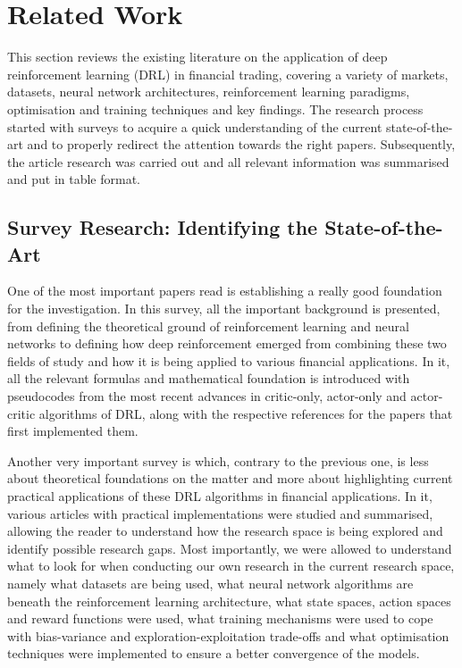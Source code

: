 \section{Related Work}

This section reviews the existing literature on the application of deep reinforcement learning (DRL) in financial trading, covering a variety of markets, datasets, neural network architectures, reinforcement learning paradigms, optimisation and training techniques and key findings. The research process started with surveys to acquire a quick understanding of the current state-of-the-art and to properly redirect the attention towards the right papers. Subsequently, the article research was carried out and all relevant information was summarised and put in table format.

\subsection{Survey Research: Identifying the State-of-the-Art}

One of the most important papers read is \cite{hambly_recent_2023} establishing a really good foundation for the investigation. In this survey, all the important background is presented, from defining the theoretical ground of reinforcement learning and neural networks to defining how deep reinforcement emerged from combining these two fields of study and how it is being applied to various financial applications. In it, all the relevant formulas and mathematical foundation is introduced with pseudocodes from the most recent advances in critic-only, actor-only and actor-critic algorithms of DRL, along with the respective references for the papers that first implemented them.

Another very important survey is \cite{fischer_reinforcement_2018} which, contrary to the previous one, is less about theoretical foundations on the matter and more about highlighting current practical applications of these DRL algorithms in financial applications. In it, various articles with practical implementations were studied and summarised, allowing the reader to understand how the research space is being explored and identify possible research gaps. Most importantly, we were allowed to understand what to look for when conducting our own research in the current research space, namely what datasets are being used, what neural network algorithms are beneath the reinforcement learning architecture, what state spaces, action spaces and reward functions were used, what training mechanisms were used to cope with bias-variance and exploration-exploitation trade-offs and what optimisation techniques were implemented to ensure a better convergence of the models.


